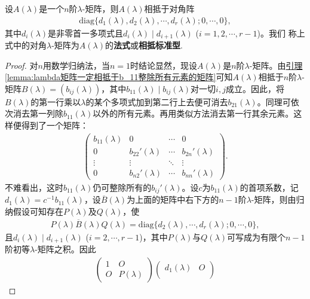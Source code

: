 \documentclass[../../main.tex]{subfiles}
\begin{document}
\begin{theorem}\label{theorem:lambda矩阵相抵于特殊的对角阵}
设$A(\lambda)$是一个$n$阶$\lambda$-矩阵，则$A(\lambda)$相抵于对角阵
\begin{align}
\mathrm{diag}\{d_1(\lambda),d_2(\lambda),\cdots,d_r(\lambda);0,\cdots,0\},\label{theorem0.1-7.1.1}
\end{align}
其中$d_i(\lambda)$是非零首一多项式且$d_i(\lambda)\mid d_{i + 1}(\lambda)$ ($i = 1,2,\cdots,r - 1$)。我们
称上式中的对角$\lambda$-矩阵为$A(\lambda)$的\textbf{法式}或\textbf{相抵标准型}. 
\end{theorem}
\begin{proof}
对$n$用数学归纳法，当$n = 1$时结论显然，现设$A(\lambda)$是$n$阶$\lambda$-矩阵。由\hyperref[lemma:lambda矩阵一定相抵于b_11整除所有元素的矩阵]{引理\ref{lemma:lambda矩阵一定相抵于b_11整除所有元素的矩阵}}可知$A(\lambda)$相抵于$n$阶$\lambda$-矩阵$B(\lambda)=(b_{ij}(\lambda))$，其中$b_{11}(\lambda)\mid b_{ij}(\lambda)$对一切$i,j$成立。因此，将$B(\lambda)$的第一行乘以$\lambda$的某个多项式加到第二行上去便可消去$b_{21}(\lambda)$。同理可依次消去第一列除$b_{11}(\lambda)$以外的所有元素。再用类似方法消去第一行其余元素。这样便得到了一个矩阵：
\begin{align*}
\begin{pmatrix}
b_{11}(\lambda)&0&\cdots&0\\
0&b_{22}'(\lambda)&\cdots&b_{2n}'(\lambda)\\
\vdots&\vdots&\ddots&\vdots\\
0&b_{n2}'(\lambda)&\cdots&b_{nn}'(\lambda)
\end{pmatrix}.
\end{align*}
不难看出，这时$b_{11}(\lambda)$仍可整除所有的$b_{ij}'(\lambda)$。设$c$为$b_{11}(\lambda)$的首项系数，记$d_1(\lambda)=c^{-1}b_{11}(\lambda)$，设$\overline{B}(\lambda)$为上面的矩阵中右下方的$n - 1$阶$\lambda$-矩阵，则由归纳假设可知存在$P(\lambda)$及$Q(\lambda)$，使
\begin{align*}
P(\lambda)\overline{B}(\lambda)Q(\lambda)=\mathrm{diag}\{d_2(\lambda),\cdots,d_r(\lambda);0,\cdots,0\},
\end{align*}
且$d_i(\lambda)\mid d_{i + 1}(\lambda)$ ($i = 2,\cdots,r - 1$)，其中$P(\lambda)$与$Q(\lambda)$可写成为有限个$n - 1$阶初等$\lambda$-矩阵之积。因此
\begin{align*}
\begin{pmatrix}
1&O\\
O&P(\lambda)
\end{pmatrix}
\begin{pmatrix}
d_1(\lambda)&O\\

\end{pmatrix}
\end{align*}
\end{proof}
\end{document}
